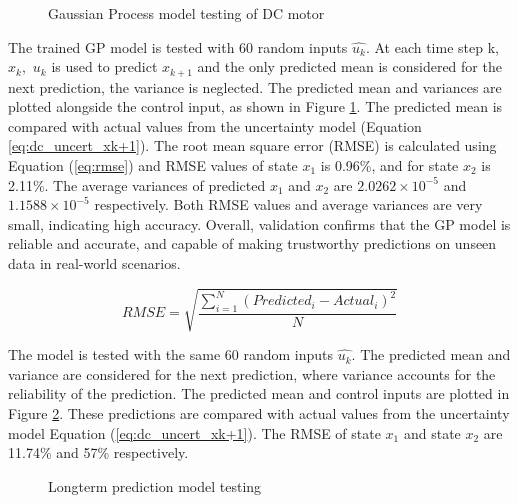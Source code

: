 \begin{figure}
    \centering
    
    \caption{Gaussian Process model testing of DC motor }
    \label{fig:GP_model_testing}
\end{figure}

The trained GP model is tested with 60 random inputs $\hat{u_k}$. At each time step k, $x_k,$ $u_k$ is used to predict $x_{k+1} $ and the only predicted mean is considered for the next prediction, the variance is neglected. The predicted mean and variances are plotted alongside the control input, as shown in Figure \ref{fig:GP_model_testing}. The predicted mean is compared with actual values from the uncertainty model (Equation \ref{eq:dc_uncert_xk+1}). The root mean square error (RMSE) is calculated using Equation (\ref{eq:rmse}) and RMSE values of state $x_1$ is 0.96\%, and for state $x_2$ is 2.11\%. The average variances of predicted $x_1$ and $x_2$ are $2.0262 \times 10^{-5}$ and $1.1588 \times 10^{-5}$ respectively. Both RMSE values and average variances are very small, indicating high accuracy. Overall, validation confirms that the GP model is reliable and accurate, and capable of making trustworthy predictions on unseen data in real-world scenarios.


\begin{equation}\label{eq:rmse}
    RMSE = \sqrt{\frac{\sum_{i=1}^{N} (Predicted_i - Actual_i)^2}{N}}
\end{equation}



 The model is tested with the same 60 random inputs $\hat{u_k}$. The predicted mean and variance are considered for the next prediction, where variance accounts for the reliability of the prediction. The predicted mean and control inputs are plotted in Figure \ref{fig:longterm_testing}. These predictions are compared with actual values from the uncertainty model Equation (\ref{eq:dc_uncert_xk+1}). The RMSE of state $x_1$ and state $x_2$ are 11.74\% and 57\% respectively.  


\begin{figure}
    \centering
    
    \caption{Longterm prediction model testing}
    \label{fig:longterm_testing}
\end{figure}

